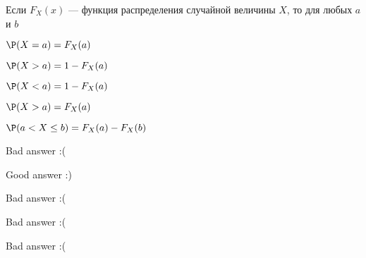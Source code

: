 
\begin{question}
Если \(F_X(x)\) — функция распределения случайной величины \(X\), то
для любых \(a\) и \(b\)
\begin{answerlist}
  \item \(\P (X = a) = F_X(a)\)
  \item \(\P (X > a) = 1 - F_X(a)\)
  \item \(\P (X < a) = 1 - F_X(a)\)
  \item \(\P (X > a) = F_X(a)\)
  \item \(\P (a<X\le b) = F_X(a)-F_X(b)\)
\end{answerlist}
\end{question}

\begin{solution}
\begin{answerlist}
  \item Bad answer :(
  \item Good answer :)
  \item Bad answer :(
  \item Bad answer :(
  \item Bad answer :(
\end{answerlist}
\end{solution}

